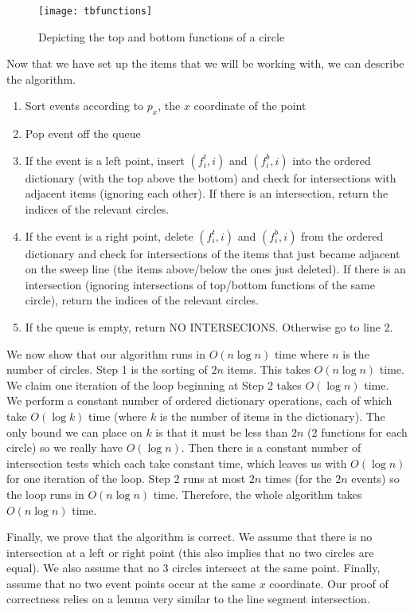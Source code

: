 \documentclass[11pt]{article}
\begin{document}
\begin{figure}[h]
   \centering
   \texttt{[image: tbfunctions]}
   \caption{Depicting the top and bottom functions of a circle}
   \label{fig:tbfunctions}
\end{figure}

\noindent Now that we have set up the items that we will be working with, we can describe the algorithm.
\begin{enumerate}
    \item Sort events according to $p_x$, the $x$ coordinate of the point
    \item Pop event off the queue
    \item If the event is a left point, insert $(f_i^t, i)$ and $(f_i^b, i)$ into the ordered dictionary (with the top above the bottom) and check for intersections with adjacent items (ignoring each other).
    If there is an intersection, return the indices of the relevant circles.
    \item If the event is a right point, delete $(f_i^t, i)$ and $(f_i^b, i)$ from the ordered dictionary and check for intersections of the items that just became adjacent on the sweep line (the items above/below the ones just deleted).
    If there is an intersection (ignoring intersections of top/bottom functions of the same circle), return the indices of the relevant circles.
    \item If the queue is empty, return NO INTERSECIONS.
    Otherwise go to line 2.
\end{enumerate}

\noindent We now show that our algorithm runs in $O(n \log n)$ time where $n$ is the number of circles.
Step 1 is the sorting of $2n$ items.
This takes $O(n \log n)$ time.
We claim one iteration of the loop beginning at Step 2 takes $O(\log n)$ time.
We perform a constant number of ordered dictionary operations, each of which take $O(\log k)$ time (where $k$ is the number of items in the dictionary).
The only bound we can place on $k$ is that it must be less than $2n$ (2 functions for each circle) so we really have $O(\log n)$.
Then there is a constant number of intersection tests which each take constant time, which leaves us with $O(\log n)$ for one iteration of the loop.
Step 2 runs at most $2n$ times (for the $2n$ events) so the loop runs in $O(n \log n)$ time.
Therefore, the whole algorithm takes $O(n \log n)$ time.

Finally, we prove that the algorithm is correct.
We assume that there is no intersection at a left or right point (this also implies that no two circles are equal).
We also assume that no 3 circles intersect at the same point.
Finally, assume that no two event points occur at the same $x$ coordinate.
Our proof of correctness relies on a lemma very similar to the line segment intersection.
\end{document}
